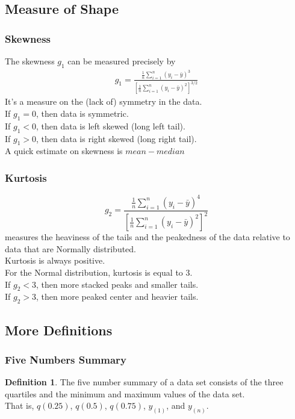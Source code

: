 \documentclass[12pt]{article}
\theoremstyle{definition}
\newtheorem*{defn}{Definition}
\begin{document}
  \subsection{Measure of Shape}
  \subsubsection{Skewness}
  The skewness $g_{1}$ can be measured precisely by
  \begin{align*}
  g_{1} =
  \frac{\frac{1}{n}\sum_{i=1}^{n}(y_{i} - \bar{y})^{3}}{\left[\frac{1}{n}\sum_{i=1}^{n}(y_{i} - \bar{y})^{2}\right]^{3/2}}
  \end{align*}
  It's a measure on the (lack of) symmetry in the data. \\
  If $g_{1} = 0$, then data is symmetric. \\
  If $g_{1} < 0$, then data is left skewed (long left tail). \\
  If $g_{1} > 0$, then data is right skewed (long right tail). \\
  A quick estimate on skewness is $mean - median$
  \subsubsection{Kurtosis}
  $$g_{2} = \frac{\frac{1}{n}\sum_{i=1}^{n}(y_{i} - \bar{y})^{4}}{\left[\frac{1}{n}\sum_{i=1}^{n}(y_{i} - \bar{y})^{2}\right]^{2}}$$
  measures the heaviness of the tails and the peakedness of the data relative to data that are Normally distributed. \\
  Kurtosis is always positive. \\
  For the Normal distribution, kurtosis is equal to 3. \\
  If $g_{2} < 3$, then more stacked peaks and smaller tails. \\
  If $g_{2} > 3$, then more peaked center and heavier tails.

  \subsection{More Definitions}
  \subsubsection{Five Numbers Summary}
  \begin{defn}
    The five number summary of a data set consists of the three quartiles and the minimum and maximum values of the data set. \\
    That is, $q(0.25)$, $q(0.5)$, $q(0.75)$, $y_{(1)}$, and $y_{(n)}$.
  \end{defn}
\end{document}
